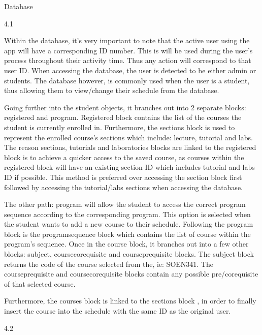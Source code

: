Database

4.1

Within the database, it's very important to note that the active user
using the app will have a corresponding ID number. This is will be used
during the user's process throughout their activity time. Thus any
action will correspond to that user ID. When accessing the database, the
user is detected to be either admin or students. The database however,
is commonly used when the user is a student, thus allowing them to
view/change their schedule from the database.

Going further into the student objects, it branches out into 2 separate
blocks: registered and program. Registered block contains the list of
the courses the student is currently enrolled in. Furthermore, the
sections block is used to represent the enrolled course's sections which
include: lecture, tutorial and labs. The reason sections, tutorials and
laboratories blocks are linked to the registered block is to achieve a
quicker access to the saved course, as courses within the registered
block will have an existing section ID which includes tutorial and labs
ID if possible. This method is preferred over accessing the section
block first followed by accessing the tutorial/labs sections when
accessing the database.

The other path: program will allow the student to access the correct
program sequence according to the corresponding program. This option is
selected when the student wants to add a new course to their schedule.
Following the program block is the programsequence block which contains
the list of course within the program's sequence. Once in the course
block, it branches out into a few other blocks: subject,
coursecorequisite and courseprequisite blocks. The subject block returns
the code of the course selected from the, ie: SOEN341. The
courseprequisite and coursecorequisite blocks contain any possible
pre/corequisite of that selected course.

Furthermore, the courses block is linked to the sections block , in
order to finally insert the course into the schedule with the same ID as
the original user.

4.2

